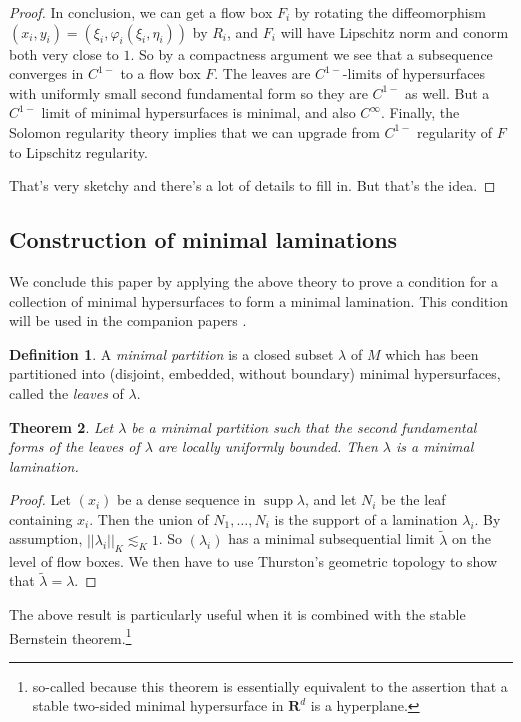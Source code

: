 \documentclass[reqno,10pt]{amsart}
\newcommand{\RR}{\mathbf{R}}
\DeclareMathOperator{\supp}{supp}
\newcommand{\dfn}[1]{\emph{#1}\index{#1}}
\newtheorem{theorem}{Theorem}[section]
\theoremstyle{definition}
\newtheorem{definition}[theorem]{Definition}
\numberwithin{equation}{section}
\begin{document}
\begin{proof}
In conclusion, we can get a flow box $F_i$ by rotating the diffeomorphism $(x_i, y_i) = (\xi_i, \varphi_i(\xi_i, \eta_i))$ by $R_i$, and $F_i$ will have Lipschitz norm and conorm both very close to $1$.
So by a compactness argument we see that a subsequence converges in $C^{1-}$ to a flow box $F$.
The leaves are $C^{1-}$-limits of hypersurfaces with uniformly small second fundamental form so they are $C^{1-}$ as well.
But a $C^{1-}$ limit of minimal hypersurfaces is minimal, and also $C^\infty$.
Finally, the Solomon regularity theory implies that we can upgrade from $C^{1-}$ regularity of $F$ to Lipschitz regularity.

That's very sketchy and there's a lot of details to fill in. But that's the idea.
\end{proof}



\subsection{Construction of minimal laminations}
We conclude this paper by applying the above theory to prove a condition for a collection of minimal hypersurfaces to form a minimal lamination.
This condition will be used in the companion papers \cite{BackusFLG, DaskalopoulosPrep2}.

\begin{definition}
A \dfn{minimal partition} is a closed subset $\lambda$ of $M$ which has been partitioned into (disjoint, embedded, without boundary) minimal hypersurfaces, called the \dfn{leaves} of $\lambda$.
\end{definition}

\begin{theorem}
Let $\lambda$ be a minimal partition such that the second fundamental forms of the leaves of $\lambda$ are locally uniformly bounded.
Then $\lambda$ is a minimal lamination.
\end{theorem}
\begin{proof}
Let $(x_i)$ be a dense sequence in $\supp \lambda$, and let $N_i$ be the leaf containing $x_i$.
Then the union of $N_1, \dots, N_i$ is the support of a lamination $\lambda_i$.
By assumption, $||\lambda_i||_K \lesssim_K 1$.
So $(\lambda_i)$ has a minimal subsequential limit $\tilde \lambda$ on the level of flow boxes.
We then have to use Thurston's geometric topology to show that $\tilde \lambda = \lambda$.
\end{proof}

The above result is particularly useful when it is combined with the stable Bernstein theorem.\footnote{so-called because this theorem is essentially equivalent to the assertion that a stable two-sided minimal hypersurface in $\RR^d$ is a hyperplane.}
\end{document}

